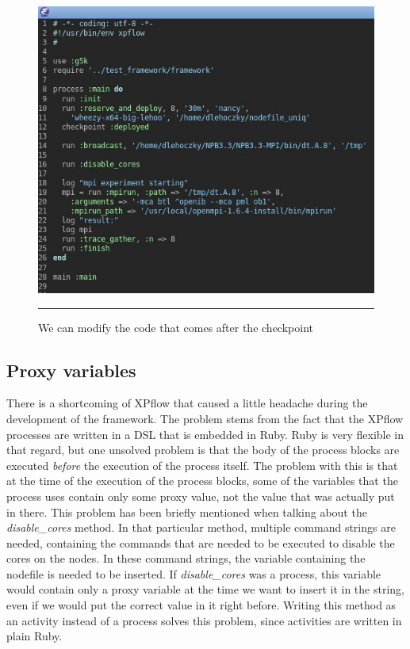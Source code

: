 \begin{figure}[htbp]
  \centering
    \includegraphics[scale=0.7]{./Figures/checkpoint2.jpg}
    \rule{35em}{0.5pt}
  \caption[Checkpoint example]{We can modify the code that comes after
  the checkpoint}
  \label{fig:checkpoint2}
\end{figure}
\subsection{Proxy variables}
\label{sec:proxy_variables}
There is a shortcoming of XPflow that caused a little headache during
the development of the framework. The problem stems from
the fact that the XPflow processes are written in a DSL that is
embedded in Ruby. Ruby is very
flexible in that regard, but one unsolved problem is that the body of
the process blocks are executed \emph{before} the execution of the
process itself. The problem with this is that at the time of the
execution of the process blocks, some of the variables that the
process uses contain only some proxy value, not the value that
was actually put in there. This problem has been briefly mentioned when
talking about the \emph{disable\_cores} method. In that particular
method, multiple command strings are needed, containing the commands
that are needed to be executed to disable the cores on the nodes. In
these command strings, the variable containing the nodefile is needed
to be inserted. If \emph{disable\_cores} was a process, this variable
would contain only a proxy variable at the
time we want to insert it in the string, even if we would put the
correct value in it right before. Writing this method as an activity
instead of a process solves this problem, since activities are written
in plain Ruby.
